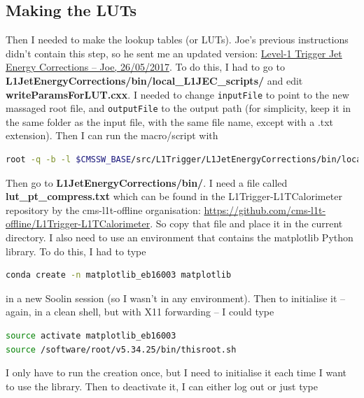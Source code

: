 \subsection{Making the LUTs}

Then I needed to make the lookup tables (or LUTs). Joe's previous instructions didn't contain this step, so he sent me an updated version: \href{run:modules/Sec 20 - Service Work Jet Energy Corrections/figures/2017_05_26_L1JECinstructions.pdf}{Level-1 Trigger Jet Energy Corrections -- Joe, 26/05/2017}. To do this, I had to go to \textbf{L1JetEnergyCorrections/bin/local\_L1JEC\_scripts/} and edit \textbf{writeParamsForLUT.cxx}. I needed to change \texttt{inputFile} to point to the new massaged root file, and \texttt{outputFile} to the output path (for simplicity, keep it in the same folder as the input file, with the same file name, except with a .txt extension). Then I can run the macro/script with

\begin{lstlisting}[belowskip=-0.7cm, language=sh, numbers=none]
root -q -b -l $CMSSW_BASE/src/L1Trigger/L1JetEnergyCorrections/bin/local_L1JEC_scripts/writeParamsForLUT.cxx
\end{lstlisting}

Then go to \textbf{L1JetEnergyCorrections/bin/}. I need a file called \textbf{lut\_pt\_compress.txt} which can be found in the L1Trigger-L1TCalorimeter repository by the cms-l1t-offline organisation: \url{https://github.com/cms-l1t-offline/L1Trigger-L1TCalorimeter}. So copy that file and place it in the current directory. I also need to use an environment that contains the matplotlib Python library. To do this, I had to type

\begin{lstlisting}[belowskip=-0.7cm, language=sh, numbers=none]
conda create -n matplotlib_eb16003 matplotlib
\end{lstlisting}

in a new Soolin session (so I wasn't in any environment). Then to initialise it -- again, in a clean shell, but with X11 forwarding -- I could type

\begin{lstlisting}[belowskip=-0.7cm, language=sh, numbers=none]
source activate matplotlib_eb16003
source /software/root/v5.34.25/bin/thisroot.sh
\end{lstlisting}

I only have to run the creation once, but I need to initialise it each time I want to use the library. Then to deactivate it, I can either log out or just type

